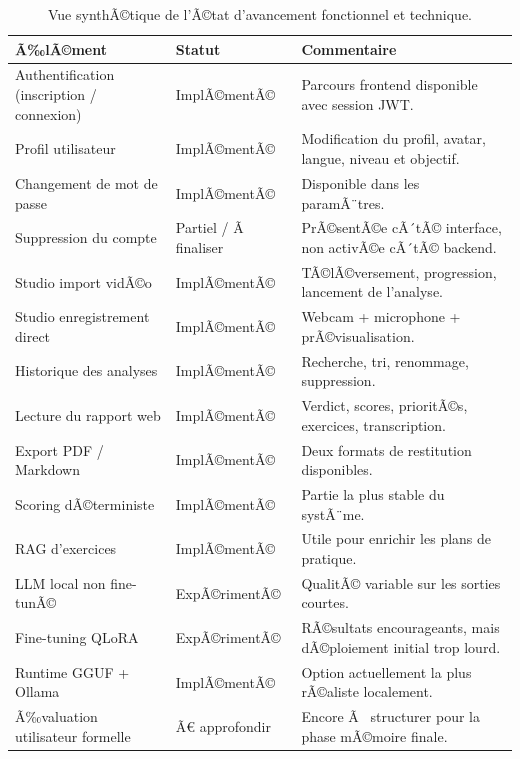 ﻿\documentclass[12pt,a4paper]{article}
\begin{document}
\begin{itemize}
\begin{table}[H]
    \centering
    \begin{tabular}{@{}p{5.2cm}p{3.2cm}p{6cm}@{}}
        \toprule
        \textbf{Ã‰lÃ©ment} & \textbf{Statut} & \textbf{Commentaire} \\
        \midrule
        Authentification (inscription / connexion) & ImplÃ©mentÃ© & Parcours frontend disponible avec session JWT. \\
        Profil utilisateur & ImplÃ©mentÃ© & Modification du profil, avatar, langue, niveau et objectif. \\
        Changement de mot de passe & ImplÃ©mentÃ© & Disponible dans les paramÃ¨tres. \\
        Suppression du compte & Partiel / Ã  finaliser & PrÃ©sentÃ©e cÃ´tÃ© interface, non activÃ©e cÃ´tÃ© backend. \\
        Studio import vidÃ©o & ImplÃ©mentÃ© & TÃ©lÃ©versement, progression, lancement de l'analyse. \\
        Studio enregistrement direct & ImplÃ©mentÃ© & Webcam + microphone + prÃ©visualisation. \\
        Historique des analyses & ImplÃ©mentÃ© & Recherche, tri, renommage, suppression. \\
        Lecture du rapport web & ImplÃ©mentÃ© & Verdict, scores, prioritÃ©s, exercices, transcription. \\
        Export PDF / Markdown & ImplÃ©mentÃ© & Deux formats de restitution disponibles. \\
        Scoring dÃ©terministe & ImplÃ©mentÃ© & Partie la plus stable du systÃ¨me. \\
        RAG d'exercices & ImplÃ©mentÃ© & Utile pour enrichir les plans de pratique. \\
        LLM local non fine-tunÃ© & ExpÃ©rimentÃ© & QualitÃ© variable sur les sorties courtes. \\
        Fine-tuning QLoRA & ExpÃ©rimentÃ© & RÃ©sultats encourageants, mais dÃ©ploiement initial trop lourd. \\
        Runtime GGUF + Ollama & ImplÃ©mentÃ© & Option actuellement la plus rÃ©aliste localement. \\
        Ã‰valuation utilisateur formelle & Ã€ approfondir & Encore Ã  structurer pour la phase mÃ©moire finale. \\
        \bottomrule
    \end{tabular}
    \caption{Vue synthÃ©tique de l'Ã©tat d'avancement fonctionnel et technique.}
\end{table}


\end{itemize}
\end{document}
